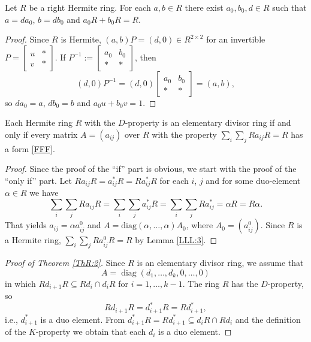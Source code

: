 \documentclass{cimart}
\DeclareMathOperator\diag{diag}
\begin{document}
\begin{lemma}\label{LLL:3}
Let $R$ be a right Hermite ring. For each $a,b\in R$ there exist $a_0,b_0, d\in R$ such that $a=da_0$, $b=db_0$ and  $a_0R+b_0R=R$.
\end{lemma}
\begin{proof}
Since $R$ is  Hermite, $(a,b)P=(d,0)\in R^{2\times 2}$ for an invertible
$P=\left[\begin{array}{cc}
u & * \\
v & *
\end{array}\right]$. If
$P^{-1}:=\left[\begin{array}{cc}
          a_0 & b_0 \\
          * & *
\end{array}\right]$,  then
\[
\textstyle
(d,0)P^{-1}=(d,0)\left[\begin{array}{cc}
          a_0 & b_0 \\
          * & *
        \end{array}\right]=(a,b),
\]
so   $da_0=a$, $db_0=b$ and $a_0u+b_0v=1$.
\end{proof}


\begin{lemma}\label{LLL:4}
Each  Hermite ring  $R$ with the  $D$-property  is an elementary divisor ring if and only if every matrix $A=(a_{ij})$ over $R$ with the property   $\sum\limits_{i}\sum\limits_{j} Ra_{ij}R=R$ has  a form  \eqref{FFF}.
\end{lemma}
\begin{proof} Since the proof of the ``if'' part  is obvious, we start with the proof of the ``only if'' part. Let $Ra_{ij}R= a_{ij}^*R= Ra_{ij}^*R$ for  each $i$, $j$ and for some duo-element $\alpha\in R$ we have
\[
\sum\limits_{i}\sum\limits_{j} Ra_{ij}R=\sum\limits_{i}\sum\limits_{j} a_{ij}^*R=\sum\limits_{i}\sum\limits_{j} Ra_{ij}^*=\alpha R=R\alpha.
\]
That yields  $a_{ij}=\alpha a_{ij}^0$ and $ A=\mathrm{diag}(\alpha,\dots,\alpha)A_0$, where $A_0= (a_{ij}^0)$.
Since $R$ is a Hermite ring,  $\sum\limits_{i}\sum\limits_{j} Ra_{ij}^0R=R$ by Lemma \ref{LLL:3}.
\end{proof}


\begin{proof}[Proof of Theorem \ref{ThR:2}]
Since  $R$ is an elementary divisor ring, we  assume   that  
\[A=\diag(d_1,\ldots, d_k, 0,\ldots, 0)\] in which $Rd_{i+1}R\subseteq Rd_i\cap d_iR$ for  $i=1,\dots, k-1$. The ring  $R$ has the $D$-property, so
\[
Rd_{i+1}R=d_{i+1}^*R=R d_{i+1}^*,
\]
i.e., $d_{i+1}^*$ is a  duo  element. From $d_{i+1}^*R=Rd_{i+1}^*\subseteq d_iR\cap Rd_i$ and the definition of the  $K$-property  we obtain  that each $d_i$ is  a duo element.
\end{proof}
\end{document}
